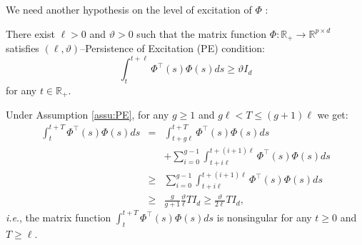 \documentclass[letterpaper, 10 pt, conference]{ieeeconf}  %
\begin{document}
We need another hypothesis on the level of excitation of $\Phi$ \cite{Morgan1977}:
\begin{assumption}
\label{assu:PE} There exist $\ell>0$ and $\vartheta>0$ such that
the matrix function $\Phi:\mathbb{R}_{+}\to\mathbb{R}^{p\times d}$
satisfies $(\ell,\vartheta)$--Persistence of Excitation (PE) condition:
\[
\int_{t}^{t+\ell}\Phi^{\top}(s)\Phi(s)ds\ge\vartheta I_{d}
\]
for any $t\in\mathbb{R_{+}}$.
\end{assumption}
Under Assumption \ref{assu:PE}, for any $g\geq1$ and $g\ell<T\leq(g+1)\ell$
we get:
\begin{align*}
\int_{t}^{t+T}\Phi^{\top}(s)\Phi(s)ds & = & \int_{t+g\ell}^{t+T}\Phi^{\top}(s)\Phi(s)ds\\
& & + \sum_{i=0}^{g-1}\int_{t+i\ell}^{t+(i+1)\ell}\Phi^{\top}(s)\Phi(s)ds\\
& \geq & \sum_{i=0}^{g-1}\int_{t+i\ell}^{t+(i+1)\ell}\Phi^{\top}(s)\Phi(s)ds\\
& \geq & \frac{g}{g+1}\frac{\vartheta}{\ell}TI_{d}\geq\frac{\vartheta}{2\ell}TI_{d},
\end{align*}
\emph{i.e}., the matrix function $\int_{t}^{t+T}\Phi^{\top}(s)\Phi(s)ds$
is nonsingular for any $t\geq0$ and $T\geq\ell$.
\end{document}
